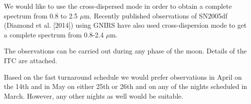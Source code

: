 \documentclass[11pt]{article}
\begin{document}
We would like to use the cross-dispersed mode in order to obtain a complete spectrum from 0.8 to 2.5 $\mu$m. Recently published observations of SN2005df (Diamond et al. [2014]) using GNIRS have also used cross-dispersion mode to get a complete spectrum from 0.8-2.4 $\mu$m.

The observations can be carried out during any phase of the moon. Details of the ITC are attached. 

Based on the fast turnaround schedule we would prefer observations in April on the 14th and in May on either 25th or 26th and on any of the nights scheduled in March. However, any other nights as well would be suitable. 
\bigskip



\bandthreeplan    %


\bigskip



\classicalbackup    %
\end{document}

